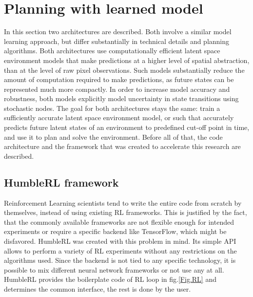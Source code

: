 \section{Planning with learned model}

In this section two architectures are described. Both involve a similar model learning approach, but differ substantially in technical details and planning algorithms. Both architectures use computationally efficient latent space environment models that make predictions at a higher level of spatial abstraction, than at the level of raw pixel observations. Such models substantially reduce the amount of computation required to make predictions, as future states can be represented much more compactly. In order to increase model accuracy and robustness, both models explicitly model uncertainty in state transitions using stochastic nodes. \cite{Algo.FastGenerativeModels}
The goal for both architectures stays the same: train a sufficiently accurate latent space environment model, or such that accurately predicts future latent states of an environment to predefined cut-off point in time, and use it to plan and solve the environment. 
Before all of that, the code architecture and the framework that was created to accelerate this research are described.

\subsection{HumbleRL framework}

Reinforcement Learning scientists tend to write the entire code from scratch by themselves, instead of using existing RL frameworks. This is justified by the fact, that the commonly available frameworks are not flexible enough for intended experiments or require a specific backend like TensorFlow, which might be disfavored.
HumbleRL \cite{Code.HRL} was created with this problem in mind. Its simple API allows to perform a variety of RL experiments without any restrictions on the algorithms used. Since the backend is not tied to any specific technology, it is possible to mix different neural network frameworks or not use any at all. HumbleRL provides the boilerplate code of RL loop in fig.\ref{Fig.RL} and determines the common interface, the rest is done by the user.

